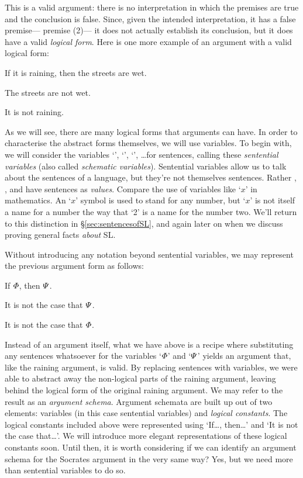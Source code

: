 This is a valid argument: there is no interpretation in which the premises are true and the conclusion is false.
Since, given the intended interpretation, it has a false premise--- premise (2)--- it does not actually establish its conclusion, but it does have a valid \emph{logical form}.
Here is one more example of an argument with a valid logical form:

\begin{earg}
  \item If it is raining, then the streets are wet.
  \item The streets are not wet.
  \item[\therefore] It is not raining.
\end{earg}

As we will see, there are many logical forms that arguments can have.
In order to characterise the abstract forms themselves, we will use variables.
To begin with, we will consider the variables `\metaA{}', `\metaB{}', `\metaC{}', \ldots for sentences, calling these \textit{sentential variables} (also called \textit{schematic variables}).
Sentential variables allow us to talk about the sentences of a language, but they're not themselves sentences.
Rather \metaA{}, \metaB{}, and \metaC{} have sentences as \textit{values}.
Compare the use of variables like `$x$' in mathematics.
An `$x$' symbol is used to stand for any number, but `$x$' is not itself a name for a number the way that `2' is a name for the number two.
We'll return to this distinction in \S\ref{sec:sentencesofSL}, and again later on when we discuss proving general facts \textit{about} SL.

Without introducing any notation beyond sentential variables, we may represent the previous argument form as follows:

\begin{earg}
  \item If $\varPhi{}$, then $\varPsi{}$.
  \item It is not the case that $\varPsi{}$.
  \item[\therefore] It is not the case that $\varPhi{}$.
\end{earg}

Instead of an argument itself, what we have above is a recipe where substituting any sentences whatsoever for the variables `$\varPhi{}$' and `$\varPsi{}$' yields an argument that, like the raining argument, is valid.
By replacing sentences with variables, we were able to abstract away the non-logical parts of the raining argument, leaving behind the logical form of the original raining argument.
We may refer to the result as an \textit{argument schema}.
Argument schemata are built up out of two elements: variables (in this case sentential variables) and \textit{logical constants}.
The logical constants included above were represented using `If\ldots, then\ldots' and `It is not the case that\ldots'.
We will introduce more elegant representations of these logical constants soon.
Until then, it is worth considering if we can identify an argument schema for the Socrates argument in the very same way?
Yes, but we need more than sentential variables to do so.








